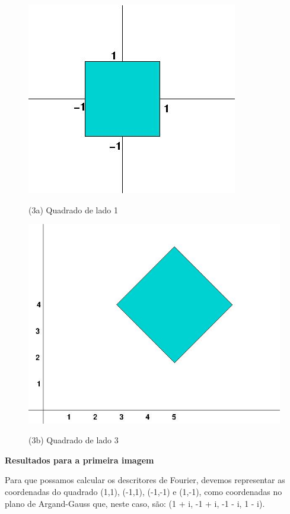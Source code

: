 \documentclass[12pt]{article}
\begin{document}
\begin{itemize}
\begin{itemize}
    \begin{figure}[htb]
    \centering
    \begin{minipage}[b]{0.45\textwidth}
    	\centering
            \includegraphics[scale=0.2]{Q3Images/square1.jpg} 
    	\centerline{\label{fig3a} \small (3a) Quadrado de lado 1}
    \end{minipage}
    \begin{minipage}[b]{0.45\textwidth}
    	\centering
            \includegraphics[scale=0.3]{Q3Images/square3.jpg} 
    	\centerline{\label{fig3b} \small (3b) Quadrado de lado 3}
    \end{minipage}
    \end{figure}

\textbf{Resultados para a primeira imagem}

Para que possamos calcular os descritores de Fourier, devemos representar as coordenadas do quadrado (1,1), (-1,1), (-1,-1) e (1,-1), como 
coordenadas no plano de Argand-Gauss que, neste caso, são: (1 + i, -1 + i, -1 - i, 1 - i).


\end{itemize}
\end{itemize}
\end{document}
